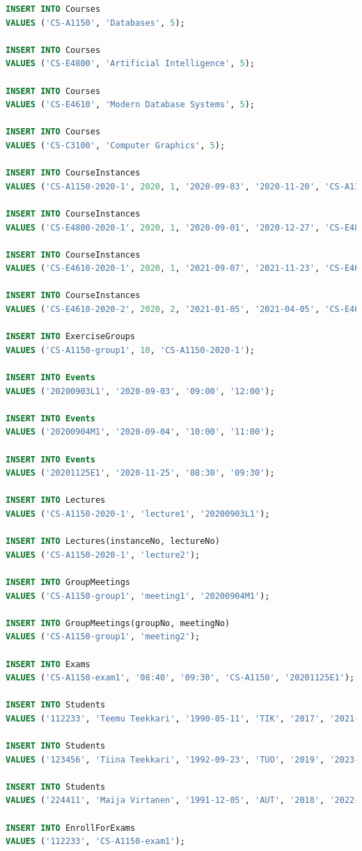 \documentclass{article}
\begin{document}
\begin{lstlisting}[language=SQL]
INSERT INTO Courses
VALUES ('CS-A1150', 'Databases', 5);

INSERT INTO Courses
VALUES ('CS-E4800', 'Artificial Intelligence', 5);

INSERT INTO Courses
VALUES ('CS-E4610', 'Modern Database Systems', 5);

INSERT INTO Courses
VALUES ('CS-C3100', 'Computer Graphics', 5);

INSERT INTO CourseInstances
VALUES ('CS-A1150-2020-1', 2020, 1, '2020-09-03', '2020-11-20', 'CS-A1150');

INSERT INTO CourseInstances
VALUES ('CS-E4800-2020-1', 2020, 1, '2020-09-01', '2020-12-27', 'CS-E4800');

INSERT INTO CourseInstances
VALUES ('CS-E4610-2020-1', 2020, 1, '2021-09-07', '2021-11-23', 'CS-E4610');

INSERT INTO CourseInstances
VALUES ('CS-E4610-2020-2', 2020, 2, '2021-01-05', '2021-04-05', 'CS-E4610');

INSERT INTO ExerciseGroups
VALUES ('CS-A1150-group1', 10, 'CS-A1150-2020-1');

INSERT INTO Events
VALUES ('20200903L1', '2020-09-03', '09:00', '12:00');

INSERT INTO Events
VALUES ('20200904M1', '2020-09-04', '10:00', '11:00');

INSERT INTO Events
VALUES ('20201125E1', '2020-11-25', '08:30', '09:30');

INSERT INTO Lectures
VALUES ('CS-A1150-2020-1', 'lecture1', '20200903L1');

INSERT INTO Lectures(instanceNo, lectureNo)
VALUES ('CS-A1150-2020-1', 'lecture2');

INSERT INTO GroupMeetings
VALUES ('CS-A1150-group1', 'meeting1', '20200904M1');

INSERT INTO GroupMeetings(groupNo, meetingNo)
VALUES ('CS-A1150-group1', 'meeting2');

INSERT INTO Exams
VALUES ('CS-A1150-exam1', '08:40', '09:30', 'CS-A1150', '20201125E1');

INSERT INTO Students
VALUES ('112233', 'Teemu Teekkari', '1990-05-11', 'TIK', '2017', '2021-08-30');

INSERT INTO Students
VALUES ('123456', 'Tiina Teekkari', '1992-09-23', 'TUO', '2019', '2023-08-30');

INSERT INTO Students
VALUES ('224411', 'Maija Virtanen', '1991-12-05', 'AUT', '2018', '2022-08-30');

INSERT INTO EnrollForExams
VALUES ('112233', 'CS-A1150-exam1');


\end{lstlisting}
\end{document}
